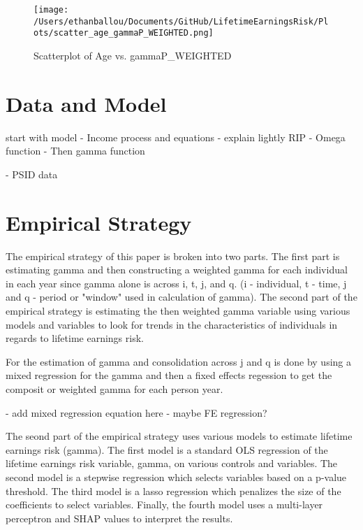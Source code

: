 \documentclass[12pt]{article}
\begin{document}
\begin{figure}[H]
    \centering
    \texttt{[image: /Users/ethanballou/Documents/GitHub/LifetimeEarningsRisk/Plots/scatter\_age\_gammaP\_WEIGHTED.png]}
    \caption{Scatterplot of Age vs. gammaP\_WEIGHTED}
\end{figure}







\begin{onehalfspace}



\section{Data and Model}


start with model
- Income process and equations 
- explain lightly RIP
- Omega function 
- Then gamma function

- PSID data





\section{Empirical Strategy}

The empirical strategy of this paper is broken into two parts. The first part is estimating gamma and then constructing a weighted gamma for each individual in each year since gamma alone is across i, t, j, and q. (i - individual, t - time, j and q - period or "window" used in calculation of gamma). The second part of the empirical strategy is estimating the then weighted gamma variable using various models and variables to look for trends in the characteristics of individuals in regards to lifetime earnings risk.

For the estimation of gamma and consolidation across j and q is done by using a mixed regression for the gamma and then a fixed effects regession to get the composit or weighted gamma for each person year.


- add mixed regression equation here
- maybe FE regression?







The seond part of the empirical strategy uses various models to estimate lifetime earnings risk (gamma). The first model is a standard OLS regression of the lifetime earnings risk variable, gamma, on various controls and variables. The second model is a stepwise regression which selects variables based on a p-value threshold. The third model is a lasso regression which penalizes the size of the coefficients to select variables. Finally, the fourth model uses a multi-layer perceptron and SHAP values to interpret the results.


\end{onehalfspace}
\end{document}
